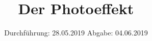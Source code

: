 

\subject{V500}
\title{Der Photoeffekt}
\date{%
Durchführung: {28.05.2019}
\hspace{3em}
Abgabe: {04.06.2019}
}



\maketitle
\thispagestyle{empty}
\tableofcontents
\newpage





\printbibliography{}

